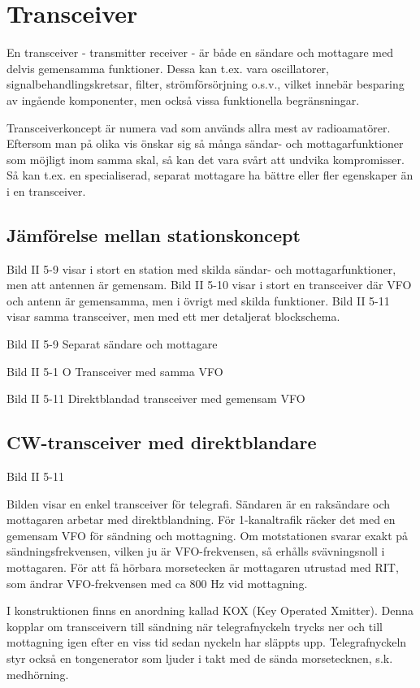 \section{Transceiver}

En transceiver - transmitter receiver - är både en sändare och
mottagare med delvis gemensamma funktioner. Dessa kan t.ex.  vara
oscillatorer, signalbehandlingskretsar, filter, strömförsörjning
o.s.v., vilket innebär besparing av ingående komponenter, men också
vissa funktionella begränsningar.

Transceiverkoncept är numera vad som används allra mest av
radioamatörer. Eftersom man på olika vis önskar sig så många sändar-
och mottagarfunktioner som möjligt inom samma skal, så kan det vara
svårt att undvika kompromisser. Så kan t.ex. en specialiserad, separat
mottagare ha bättre eller fler egenskaper än i en transceiver.

\subsection{Jämförelse mellan stationskoncept}

Bild II 5-9 visar i stort en station med skilda sändar- och
mottagarfunktioner, men att antennen är gemensam.  Bild II 5-10 visar
i stort en transceiver där VFO och antenn är gemensamma, men i övrigt
med skilda funktioner.  Bild II 5-11 visar samma transceiver, men med
ett mer detaljerat blockschema.

Bild II 5-9 Separat sändare och mottagare

Bild II 5-1 O Transceiver med samma VFO

Bild II 5-11 Direktblandad transceiver med gemensam VFO

\subsection{CW-transceiver med direktblandare}

Bild II 5-11

Bilden visar en enkel transceiver för telegrafi. Sändaren är en
raksändare och mottagaren arbetar med direktblandning. För
1-kanaltrafik räcker det med en gemensam VFO för sändning och
mottagning. Om motstationen svarar exakt på sändningsfrekvensen,
vilken ju är VFO-frekvensen, så erhålls svävningsnoll i
mottagaren. För att få hörbara morsetecken är mottagaren utrustad med
RIT, som ändrar VFO-frekvensen med ca 800 Hz vid mottagning.

I konstruktionen finns en anordning kallad KOX (Key Operated
Xmitter). Denna kopplar om transceivern till sändning när
telegrafnyckeln trycks ner och till mottagning igen efter en viss tid
sedan nyckeln har släppts upp. Telegrafnyckeln styr också en
tongenerator som ljuder i takt med de sända morsetecknen,
s.k. medhörning.

